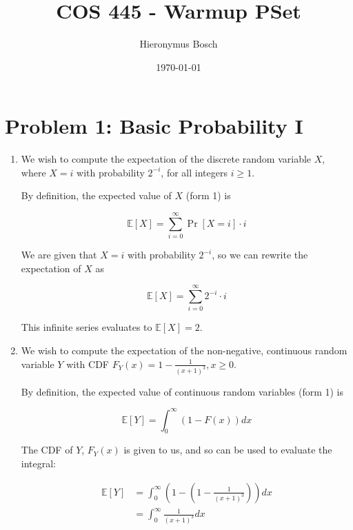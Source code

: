 \documentclass[12pt]{article}%
\begin{document}
\title{COS 445 - Warmup PSet} %
\author{Hieronymus Bosch} %
\date{\today}
\maketitle

\section*{Problem 1: Basic Probability I}
\begin{enumerate}[label=(\alph*)]
\item We wish to compute the expectation of the discrete random variable $X$, where $X = i$ with probability $2^{-i}$, for all integers $i \ge 1$.

By definition, the expected value of $X$ (form 1) is 

\begin{equation}
\mathbb{E}[X] = \sum_{i = 0}^{\infty} \Pr[X = i] \cdot i
\end{equation}

We are given that $X = i$ with probability $2^{-i}$, so we can rewrite the expectation of $X$ as

\begin{equation}
\mathbb{E}[X] = \sum_{i = 0}^{\infty} 2^{-i} \cdot i
\end{equation}

This infinite series evaluates to $\mathbb{E}[X] = 2$.

\item We wish to compute the expectation of the non-negative, continuous random variable $Y$ with CDF $F_Y(x) = 1 - \frac{1}{(x + 1)^3}, x \ge 0$.

By definition, the expected value of continuous random variables (form 1) is

\begin{equation}
\mathbb{E}[Y] = \int_{0}^{\infty} (1- F(x))dx
\end{equation}

The CDF of $Y$, $F_Y(x)$ is given to us, and so can be used to evaluate the integral:

\begin{equation}
\begin{split}
\mathbb{E}[Y] &= \int_{0}^{\infty} (1- (1 - \frac{1}{(x + 1)^3}))dx \\
&= \int_{0}^{\infty} \frac{1}{(x + 1)^3}dx
\end{split}
\end{equation}


\end{enumerate}
\end{document}

